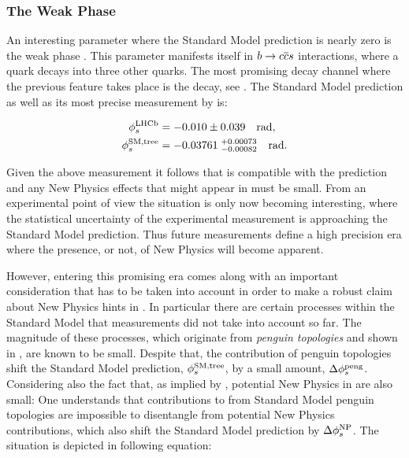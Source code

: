\subsubsection{The Weak Phase \phis}

An interesting parameter where the Standard Model prediction is nearly zero is the weak phase \phis.
This parameter manifests itself in $b\rightarrow c\overline {c}s$ interactions, where a \bquark
quark decays into three other quarks. The most promising decay channel where the previous feature
takes place is the \BsJpsiPhi decay, see . The Standard Model \phis
prediction as well as its most precise measurement by \lhcb is:

\begin{subequations}
  \label{app_phis_lhcb_theo}
  \begin{align}
  \centering
  \phiS{\lhcb}           &=  -0.010 \pm 0.039  \quad {\rm rad},
  \label{app_phis_lhcb}\\
  \phiS{SM,tree}  &= -0.03761 \; ^{+0.00073}_{-0.00082}  \quad {\rm rad}.
  \label{app_phis_theo}
\end{align}
\end{subequations}

\noindent Given the above measurement it follows that \phis is compatible
with the prediction and any New Physics effects that might appear in \phis must be small.
From an experimental point of view the situation is only now becoming interesting,
where the statistical uncertainty of the experimental measurement is approaching
the Standard Model prediction. Thus future \phis measurements define a high precision
era where the presence, or not, of New Physics will become apparent.

However, entering this promising era comes along with an important consideration
that has to be taken into account in order to make a robust claim about New Physics hints in \phis.
In particular there are certain processes within the Standard Model that \phis measurements
did not take into account so far. The magnitude of these processes, which originate from {\it penguin topologies}
and shown in , are known to be small. Despite that, the
contribution of penguin topologies shift the Standard Model prediction,
$\phi_{s}^{\tiny \text{SM,tree}}$, by a small amount, $\Delta\phi_{s}^{\tiny\text{peng}}$. Considering
also the fact that, as implied by , potential New Physics
in \phis are also small: One understands that contributions to \phis from Standard Model penguin
topologies are impossible to disentangle from potential New Physics contributions, which also
shift the Standard Model prediction by $\Delta\phi_{s}^{\tiny \text{NP}}$.
The situation is depicted in following equation:

